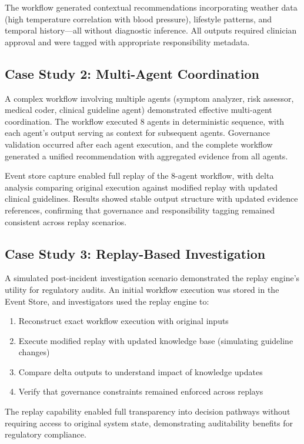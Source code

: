 \documentclass[conference]{IEEEtran}
\begin{document}
The workflow generated contextual recommendations incorporating weather data (high temperature correlation with blood pressure), lifestyle patterns, and temporal history—all without diagnostic inference. All outputs required clinician approval and were tagged with appropriate responsibility metadata.

\subsection{Case Study 2: Multi-Agent Coordination}
A complex workflow involving multiple agents (symptom analyzer, risk assessor, medical coder, clinical guideline agent) demonstrated effective multi-agent coordination. The workflow executed 8 agents in deterministic sequence, with each agent's output serving as context for subsequent agents. Governance validation occurred after each agent execution, and the complete workflow generated a unified recommendation with aggregated evidence from all agents.

Event store capture enabled full replay of the 8-agent workflow, with delta analysis comparing original execution against modified replay with updated clinical guidelines. Results showed stable output structure with updated evidence references, confirming that governance and responsibility tagging remained consistent across replay scenarios.

\subsection{Case Study 3: Replay-Based Investigation}
A simulated post-incident investigation scenario demonstrated the replay engine's utility for regulatory audits. An initial workflow execution was stored in the Event Store, and investigators used the replay engine to:

\begin{enumerate}
    \item Reconstruct exact workflow execution with original inputs
    \item Execute modified replay with updated knowledge base (simulating guideline changes)
    \item Compare delta outputs to understand impact of knowledge updates
    \item Verify that governance constraints remained enforced across replays
\end{enumerate}

The replay capability enabled full transparency into decision pathways without requiring access to original system state, demonstrating auditability benefits for regulatory compliance.
\end{document}
